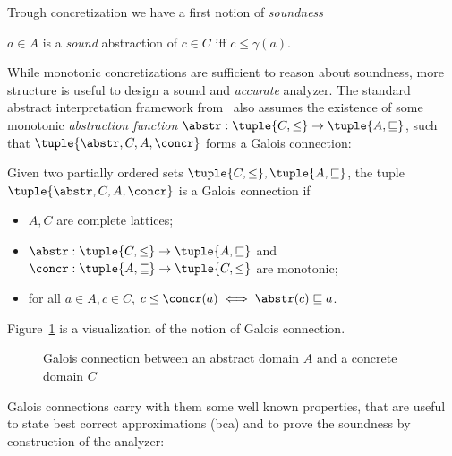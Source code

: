 Trough concretization we have a first notion of \emph{soundness}

\begin{definition}[Soundness]
  \(a \in A\) is a \emph{sound} abstraction of \(c\in C\) iff
  \(c \leq \gamma(a)\).
\end{definition}

While monotonic concretizations are sufficient to reason about
soundness, more structure is useful to design a sound and
\emph{accurate} analyzer. The standard abstract interpretation
framework from~\cite{patrickradhia:one} also assumes the existence of
some monotonic \emph{abstraction function}
\({\abstr : \tuple{C, \leq} \to \tuple{A, \sqsubseteq}}\), such that
\(\tuple{\abstr, C, A, \concr}\) forms a Galois connection:

\begin{definition}
  Given two partially ordered sets
  \(\tuple{C, \leq}, \tuple{A, \sqsubseteq}\), the tuple
  \(\tuple{\abstr, C, A, \concr}\) is a Galois connection if
  \begin{itemize}
  \item \(A,C\) are complete lattices;
  \item \(\abstr : \tuple{C, \leq} \to \tuple{A, \sqsubseteq}\) and
    \(\concr : \tuple{A, \sqsubseteq} \to \tuple{C, \leq}\) are monotonic;
  \item for all \(a\in A, c\in C\), \(c \leq \concr(a) \iff \abstr(c) \sqsubseteq a\).
  \end{itemize}

  Figure~\ref{fig:galois} is a visualization of the notion of Galois
  connection.
\end{definition}

\begin{figure}
  \centering
  \usetikzlibrary {arrows.meta}
  \caption{Galois connection between an abstract domain \(A\) and a
    concrete domain \(C\)}\label{fig:galois}
\end{figure}

Galois connections carry with them some well known properties, that
are useful to state best correct approximations (bca) and to prove the
soundness by construction of the analyzer:

